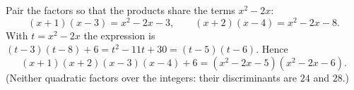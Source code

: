 Pair the factors so that the products share the terms $x^2-2x$:
\[
(x+1)(x-3)=x^2-2x-3,\qquad (x+2)(x-4)=x^2-2x-8 .
\]
With $t=x^2-2x$ the expression is $(t-3)(t-8)+6=t^2-11t+30=(t-5)(t-6)$. Hence
\[
(x+1)(x+2)(x-3)(x-4)+6=\boxed{(x^2-2x-5)(x^2-2x-6)}.
\]
(Neither quadratic factors over the integers: their discriminants are $24$ and $28$.)
